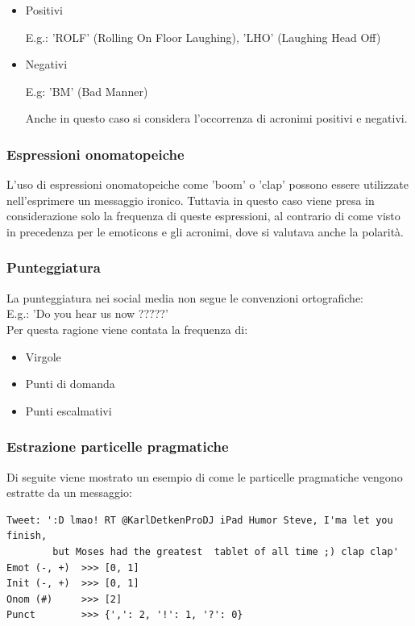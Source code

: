 \documentclass[oneside]{book}
\begin{document}
\begin{itemize}
	\item
	Positivi
	
	E.g.: 'ROLF' (Rolling On Floor Laughing), 'LHO' (Laughing Head Off)
	\item
	Negativi
	
	E.g: 'BM' (Bad Manner)
	
Anche in questo caso si considera l'occorrenza di acronimi positivi e negativi.
\end{itemize}

\subsubsection{Espressioni onomatopeiche}
L'uso di espressioni onomatopeiche come 'boom' o 'clap' possono essere utilizzate nell'esprimere un messaggio ironico. Tuttavia in questo caso viene presa in considerazione solo la frequenza di queste espressioni, al contrario di come visto in precedenza per le emoticons e gli acronimi, dove si valutava anche la polarità.

\subsubsection{Punteggiatura}
La punteggiatura nei social media non segue le convenzioni ortografiche:\\
E.g.: 'Do you hear us now ?????'\\
Per questa ragione viene contata la frequenza di:
\begin{itemize}
	\item Virgole
	
	\item Punti di domanda
	
	\item Punti escalmativi
\end{itemize}

\subsubsection{Estrazione particelle pragmatiche}
Di seguite viene mostrato un esempio di come le particelle pragmatiche vengono estratte da un messaggio:

\begin{lstlisting}[caption={Esempio di tweet processato per estrarre le particelle pragmatiche.}]
Tweet: ':D lmao! RT @KarlDetkenProDJ iPad Humor Steve, I'ma let you finish,
        but Moses had the greatest  tablet of all time ;) clap clap'
Emot (-, +)  >>> [0, 1]
Init (-, +)  >>> [0, 1]
Onom (#)     >>> [2]
Punct        >>> {',': 2, '!': 1, '?': 0}
\end{lstlisting}
\end{document}
